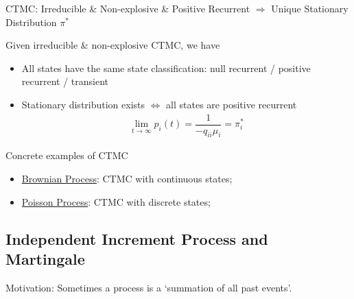 \begin{point}
    CTMC: Irreducible \& Non-explosive \& Positive Recurrent $ \Rightarrow  $ Unique Stationary Distribution $ \pi^* $
\end{point}

Given irreducible \& non-explosive CTMC, we have
\begin{itemize}[topsep=2pt,itemsep=0pt]
    \item All states have the same state classification: null recurrent / positive recurrent / transient
    \item Stationary distribution exists $ \Leftrightarrow $ all states are positive recurrent
    \begin{align}
        \lim_{t\to\infty}p_i(t)=\dfrac{1}{-q_{ii}\mu _i} = \pi^*_i
    \end{align}
\end{itemize}


\begin{point}
    Concrete examples of CTMC
\end{point}
\begin{itemize}[topsep=2pt,itemsep=0pt]
    \item \hyperlink{BrownianProcess}{Brownian Process}: CTMC with continuous states;
    \item \hyperlink{PoissonProcess}{Poisson Process}: CTMC with discrete states;
\end{itemize}


\subsection{Independent Increment Process and Martingale}\label{SubSubSectionIndepedentProcess}

Motivation: Sometimes a process is a `summation of all past events'.


